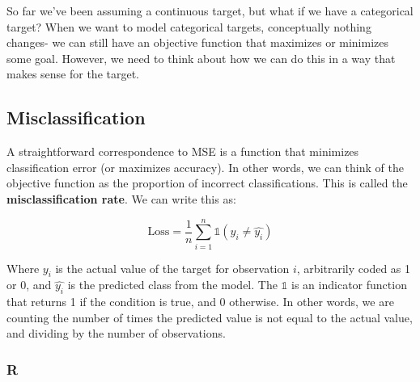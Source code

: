 \documentclass[
  letterpaper,
]{krantz}
\begin{document}
So far we've been assuming a continuous target, but what if we have a
categorical target? When we want to model categorical targets,
conceptually nothing changes- we can still have an objective function
that maximizes or minimizes some goal. However, we need to think about
how we can do this in a way that makes sense for the target.

\subsection{Misclassification}\label{misclassification}

A straightforward correspondence to MSE is a function that minimizes
classification error (or maximizes accuracy). In other words, we can
think of the objective function as the proportion of incorrect
classifications. This is called the \textbf{misclassification rate}. We
can write this as:

\[
\textrm{Loss} = \frac{1}{n} \sum_{i=1}^{n} \mathbb{1}(y_i \neq \hat{y_i})
\]

Where \(y_i\) is the actual value of the target for observation \(i\),
arbitrarily coded as 1 or 0, and \(\hat{y_i}\) is the predicted class
from the model. The \(\mathbb{1}\) is an indicator function that returns
1 if the condition is true, and 0 otherwise. In other words, we are
counting the number of times the predicted value is not equal to the
actual value, and dividing by the number of observations.

\subsubsection{R}
\end{document}
